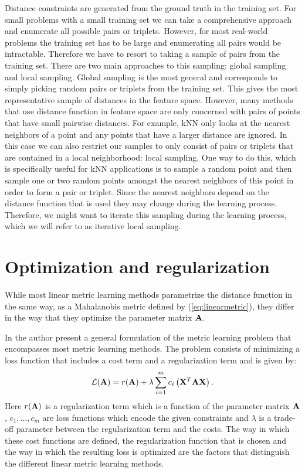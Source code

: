 Distance constraints are generated from the ground truth in the training set. For small problems with a small training set we can take a comprehensive approach and enumerate all possible pairs or triplets. However, for most real-world problems the training set has to be large and enumerating all pairs would be intractable. Therefore we have to resort to taking a sample of pairs from the training set. There are two main approaches to this sampling: global sampling and local sampling. Global sampling is the most general and corresponds to simply picking random pairs or triplets from the training set. This gives the most representative sample of distances in the feature space. However, many methods that use distance function in feature space are only concerned with pairs of points that have small pairwise distances. For example, \ac{kNN} only looks at the nearest neighbors of a point and any points that have a larger distance are ignored. In this case we can also restrict our samples to only consist of pairs or triplets that are contained in a local neighborhood: local sampling. One way to do this, which is specifically useful for \ac{kNN} applications is to sample a random point and then sample one or two random points amongst the nearest neighbors of this point in order to form a pair or triplet. Since the nearest neighbors depend on the distance function that is used they may change during the learning process. Therefore, we might want to iterate this sampling during the learning process, which we will refer to as iterative local sampling.



\section{Optimization and regularization}
\label{sec:background_opimization}

While most linear metric learning methods parametrize the distance function in the same way, as a Mahalanobis metric defined by (\ref{eq:linearmetric}), they differ in the way that they optimize the parameter matrix $\mathbf{A}$.

In \cite{kulis2012metric} the author present a general formulation of the metric learning problem that encompasses most metric learning methods. The problem consists of minimizing a loss function that includes a cost term and a regularization term and is given by:
\begin{equation}
\mathcal{L}(\mathbf{A}) = r(\mathbf{A}) + \lambda \sum_{i=1}^{m} c_i \left(\mathbf{X}^T\mathbf{A}\mathbf{X}\right).
\label{eq:metriclearningmodel}
\end{equation}
Here $r(\mathbf{A})$ is a regularization term which is a function of the parameter matrix $\mathbf{A}$, $c_1, ..., c_m$ are loss functions which encode the given constraints and $\lambda$ is a trade-off parameter between the regularization term and the costs. The way in which these cost functions are defined, the regularization function that is chosen and the way in which the resulting loss is optimized are the factors that distinguish the different linear metric learning methods.

